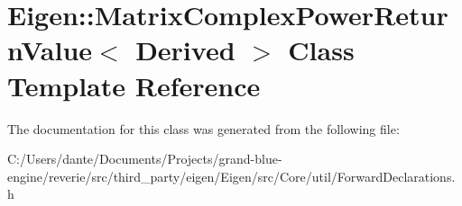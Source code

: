 \hypertarget{class_eigen_1_1_matrix_complex_power_return_value}{}\section{Eigen\+::Matrix\+Complex\+Power\+Return\+Value$<$ Derived $>$ Class Template Reference}
\label{class_eigen_1_1_matrix_complex_power_return_value}


The documentation for this class was generated from the following file\+:\begin{DoxyCompactItemize}
\item 
C\+:/\+Users/dante/\+Documents/\+Projects/grand-\/blue-\/engine/reverie/src/third\+\_\+party/eigen/\+Eigen/src/\+Core/util/Forward\+Declarations.\+h\end{DoxyCompactItemize}

